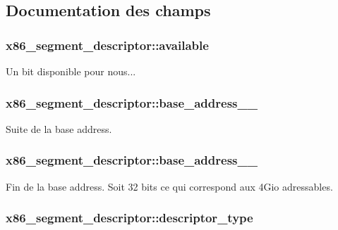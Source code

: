 \subsection{\-Documentation des champs}
\hypertarget{structx86__segment__descriptor_a761494a7a460e493e0d5d188a31cd052}{
\subsubsection[{available}]{ {\bf x86\-\_\-segment\-\_\-descriptor\-::available}}}\label{structx86__segment__descriptor_a761494a7a460e493e0d5d188a31cd052}
\-Un bit disponible pour nous... \hypertarget{structx86__segment__descriptor_a95889fcbabf116ba15a6cea3364b903d}{
\subsubsection[{base\-\_\-address\-\_\-23\-\_\-16}]{ {\bf x86\-\_\-segment\-\_\-descriptor\-::base\-\_\-address\-\_\-\_}}}\label{structx86__segment__descriptor_a95889fcbabf116ba15a6cea3364b903d}
\-Suite de la base address. \hypertarget{structx86__segment__descriptor_af839dd21992c16573ea5b816b72f249f}{
\subsubsection[{base\-\_\-address\-\_\-31\-\_\-24}]{ {\bf x86\-\_\-segment\-\_\-descriptor\-::base\-\_\-address\-\_\-\_}}}\label{structx86__segment__descriptor_af839dd21992c16573ea5b816b72f249f}
\-Fin de la base address. \-Soit 32 bits ce qui correspond aux 4\-Gio adressables. \hypertarget{structx86__segment__descriptor_adda0434239b7e6c6a68b8e7556e4bb2f}{
\subsubsection[{descriptor\-\_\-type}]{ {\bf x86\-\_\-segment\-\_\-descriptor\-::descriptor\-\_\-type}}}\label{structx86__segment__descriptor_adda0434239b7e6c6a68b8e7556e4bb2f}
